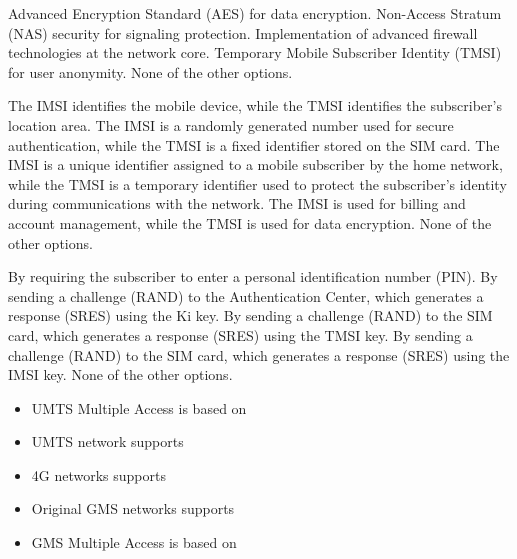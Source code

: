 \begin{checkboxes}
    \CorrectChoice Advanced Encryption Standard (AES) for data encryption.
    \CorrectChoice Non-Access Stratum (NAS) security for signaling protection.
    \choice Implementation of advanced firewall technologies at the network core.
    \choice Temporary Mobile Subscriber Identity (TMSI) for user anonymity.
    \choice None of the other options.
\end{checkboxes}

\begin{checkboxes}
    \choice The IMSI identifies the mobile device, while the TMSI identifies the subscriber's location area.
    \choice The IMSI is a randomly generated number used for secure authentication, while the TMSI is a fixed identifier stored on the SIM card.
    \CorrectChoice The IMSI is a unique identifier assigned to a mobile subscriber by the home network, while the TMSI is a temporary identifier used to protect the subscriber's identity during communications with the network.
    \choice The IMSI is used for billing and account management, while the TMSI is used for data encryption.
    \choice None of the other options.
\end{checkboxes}

\begin{checkboxes}
    \choice By requiring the subscriber to enter a personal identification number (PIN).
    \choice By sending a challenge (RAND) to the Authentication Center, which generates a response (SRES) using the Ki key.
    \choice By sending a challenge (RAND) to the SIM card, which generates a response (SRES) using the TMSI key.
    \choice By sending a challenge (RAND) to the SIM card, which generates a response (SRES) using the IMSI key.
    \CorrectChoice None of the other options.
\end{checkboxes}

\begin{solution}
    \begin{itemize}
        \item UMTS Multiple Access is based on 
        \item UMTS network supports 
        \item 4G networks supports 
        \item Original GMS networks supports 
        \item GMS Multiple Access is based on 
    \end{itemize}
\end{solution}
